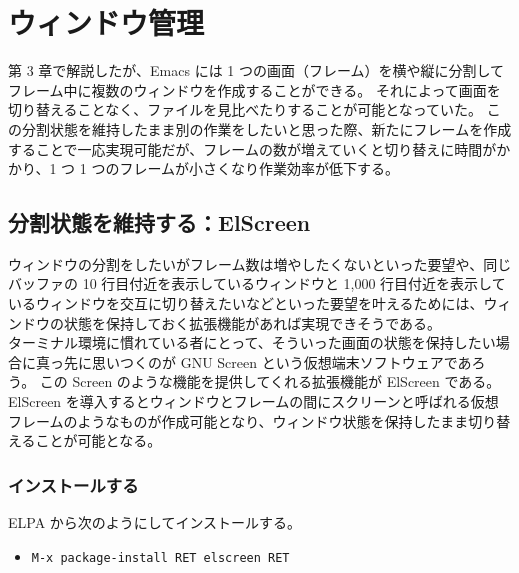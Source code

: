 \section{ウィンドウ管理}
第 3 章で解説したが、Emacs には 1 つの画面（フレーム）を横や縦に分割してフレーム中に複数のウィンドウを作成することができる。
それによって画面を切り替えることなく、ファイルを見比べたりすることが可能となっていた。
この分割状態を維持したまま別の作業をしたいと思った際、新たにフレームを作成することで一応実現可能だが、フレームの数が増えていくと切り替えに時間がかかり、1 つ 1 つのフレームが小さくなり作業効率が低下する。
\subsection{分割状態を維持する：ElScreen}
ウィンドウの分割をしたいがフレーム数は増やしたくないといった要望や、同じバッファの 10 行目付近を表示しているウィンドウと 1,000 行目付近を表示しているウィンドウを交互に切り替えたいなどといった要望を叶えるためには、ウィンドウの状態を保持しておく拡張機能があれば実現できそうである。\\

ターミナル環境に慣れている者にとって、そういった画面の状態を保持したい場合に真っ先に思いつくのが GNU Screen という仮想端末ソフトウェアであろう。
この Screen のような機能を提供してくれる拡張機能が ElScreen である。
ElScreen を導入するとウィンドウとフレームの間にスクリーンと呼ばれる仮想フレームのようなものが作成可能となり、ウィンドウ状態を保持したまま切り替えることが可能となる。
\subsubsection{インストールする}
ELPA から次のようにしてインストールする。
\begin{itemize}\setlength{\leftskip}{-1.00zw}%
\item[] \texttt{M-x package-install RET elscreen RET}
\end{itemize}
